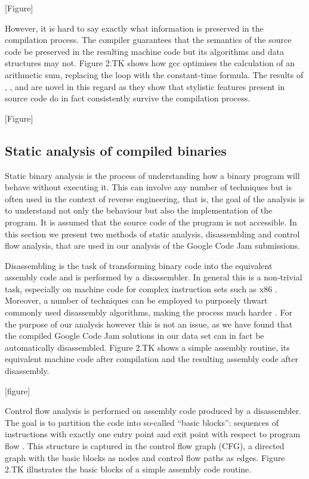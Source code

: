 \documentclass[a4paper,11pt]{kth-mag}
\begin{document}
[Figure]

However, it is hard to say exactly what information is preserved in the
compilation process. The compiler guarantees that the semantics of the source
code be preserved in the resulting machine code but its algorithms and data
structures may not. Figure 2.TK shows how gcc optimises the calculation of an
arithmetic sum, replacing the loop with the constant-time formula. The results
of \parencite{rosenblum2011wrote}, \parencite{caliskan2015coding}, and
\parencite{alrabaee2014oba2} are novel in this regard as they show that
stylistic features present in source code do in fact consistently survive the
compilation process.

[Figure]
\subsection{Static analysis of compiled binaries} \label{static-analysis-tb}
Static binary analysis is the process of understanding how a binary program
will behave without executing it. This can involve any number of techniques
but is often used in the context of reverse engineering, that is, the goal of
the analysis is to understand not only the behaviour but also the
implementation of the program. It is assumed that the source code of the
program is not accessible. In this section we present two methods of static
analysis, disassembling and control flow analysis, that are used in our
analysis of the Google Code Jam submissions.

Disassembling is the task of transforming binary code into the equivalent
assembly code and is performed by a disassembler. In general this is a
non-trivial task, especially on machine code for complex instruction sets such
as x86 \parencite{wartell2011differentiating}. Moreover, a number of techniques
can be employed to purposely thwart commonly used disassembly algorithms,
making the process much harder \parencite{linn2003obfuscation}. For the purpose
of our analysis however this is not an issue, as we have found that the
compiled Google Code Jam solutions in our data set can in fact be automatically
disassembled. Figure 2.TK shows a simple assembly routine, its equivalent
machine code after compilation and the resulting assembly code after
disassembly.

[figure]

Control flow analysis is performed on assembly code produced by a disassembler.
The goal is to partition the code into so-called “basic blocks”: sequences of
instructions with exactly one entry point and exit point with respect to
program flow \parencite{allen1970control}. This structure is captured in the
control flow graph (CFG), a directed graph with the basic blocks as nodes and
control flow paths as edges. Figure 2.TK illustrates the basic blocks of a
simple assembly code routine.
\end{document}
